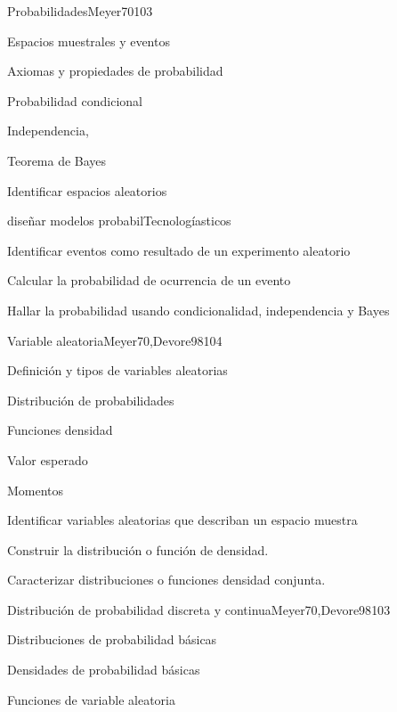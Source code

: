 \begin{syllabus}
\begin{unit}{Probabilidades}{}{Meyer70}{10}{3}
\begin{topics}
      \item Espacios muestrales y eventos
      \item Axiomas y propiedades de probabilidad
      \item Probabilidad condicional
      \item Independencia,
      \item Teorema de Bayes
   \end{topics}
   \begin{learningoutcomes}
      \item Identificar espacios aleatorios
      \item diseñar  modelos probabilTecnologíasticos
      \item Identificar eventos como resultado de un experimento aleatorio
      \item Calcular la probabilidad de ocurrencia de un evento
      \item Hallar la probabilidad usando condicionalidad, independencia y Bayes
   \end{learningoutcomes}
\end{unit}

\begin{unit}{Variable aleatoria}{}{Meyer70,Devore98}{10}{4}
\begin{topics}
      \item Definición y tipos de variables aleatorias
      \item Distribución de probabilidades
      \item Funciones densidad
      \item Valor esperado
      \item Momentos
   \end{topics}

   \begin{learningoutcomes}
      \item Identificar variables aleatorias que describan un espacio muestra
      \item Construir la distribución o función de densidad.
      \item Caracterizar distribuciones o funciones densidad conjunta.
   \end{learningoutcomes}
\end{unit}

\begin{unit}{Distribución de probabilidad discreta y continua}{}{Meyer70,Devore98}{10}{3}
\begin{topics}
      \item Distribuciones de probabilidad básicas
      \item Densidades de probabilidad básicas
      \item Funciones de variable aleatoria
   \end{topics}


\end{unit}
\end{syllabus}
